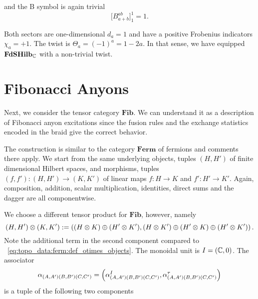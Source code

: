and the B symbol is again trivial
\begin{equation}
    \big[B^{ab}_{a + b}\big]^1_1 = 1
    .
\end{equation}

Both sectors are one-dimensional $d_a = 1$ and have a positive Frobenius indicators $\chi_a = +1$.
%
The twist is $\Theta_a = (-1)^a = 1 - 2a$.
%
In that sense, we have equipped $\mathbf{FdSHilb}_{\mathbb{C}}$ with a non-trivial twist.

\section{Fibonacci Anyons}
\label{sec:topo_data:fib}

Next, we consider the tensor category $\mathbf{Fib}$.
%
We can understand it as a description of Fibonacci anyon excitations since the fusion rules and the exchange statistics encoded in the braid give the correct behavior.

The construction is similar to the category $\mathbf{Ferm}$ of fermions and comments there apply.
%
We start from the same underlying objects, tuples $(H,H')$ of finite dimensional Hilbert spaces, and morphisms, tuples $(f,f'): (H,H') \to (K,K')$ of linear maps $f: H \to K$ and $f': H' \to K'$.
%
Again, composition, addition, scalar multiplication, identities, direct sums and the dagger are all componentwise.

We choose a different tensor product for $\mathbf{Fib}$, however, namely
\begin{equation}
    \label{eq:topo_data:fib:def_otimes_objects}
    \fermpair{H}{H'} \otimes \fermpair{K}{K'}
    := \fermpair{(H \otimes K) \oplus (H' \otimes K')}{(H \otimes K') \oplus (H' \otimes K) \oplus (H' \otimes K')}
    .
\end{equation}
%
Note the additional term in the second component compared to ~\eqref{eq:topo_data:ferm:def_otimes_objects}.
%
The monoidal unit is $I=\fermpair{\Cbb}{0}$.
%
The associator $$\alpha_{\fermpair{A}{A'}\fermpair{B}{B'}\fermpair{C}{C'}} = \fermpair{\alpha^I_{\fermpair{A}{A'}\fermpair{B}{B'}\fermpair{C}{C'}}}{\alpha^\tau_{\fermpair{A}{A'}\fermpair{B}{B'}\fermpair{C}{C'}}}$$ is a tuple of the following two components

